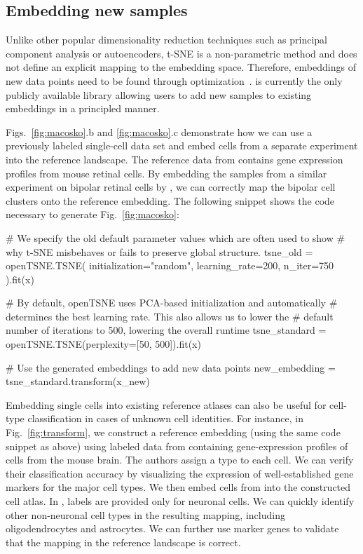 \documentclass[article]{jss}
\newcommand{\opentsne}{\pkg{openTSNE}\xspace}
\begin{document}
\subsection{Embedding new samples}

Unlike other popular dimensionality reduction techniques such as principal component analysis or autoencoders, t-SNE is a non-parametric method and does not define an explicit mapping to the embedding space. Therefore, embeddings of new data points need to be found through optimization~\citep{policar2021embedding}. \opentsne is currently the only publicly available library allowing users to add new samples to existing embeddings in a principled manner.

Figs.~\ref{fig:macosko}.b and \ref{fig:macosko}.c demonstrate how we can use a previously labeled single-cell data set and embed cells from a separate experiment into the reference landscape. The reference data from \citet{macosko2015highly} contains gene expression profiles from mouse retinal cells. By embedding the samples from a similar experiment on bipolar retinal cells by \citet{shekhar2016comprehensive}, we can correctly map the bipolar cell clusters onto the reference embedding. The following snippet shows the code necessary to generate Fig.~\ref{fig:macosko}:
\begin{CodeChunk}
\begin{CodeInput}
# We specify the old default parameter values which are often used to show
# why t-SNE misbehaves or fails to preserve global structure.
tsne_old = openTSNE.TSNE(
    initialization="random", learning_rate=200, n_iter=750
).fit(x)

# By default, openTSNE uses PCA-based initialization and automatically
# determines the best learning rate. This also allows us to lower the
# default number of iterations to 500, lowering the overall runtime
tsne_standard = openTSNE.TSNE(perplexity=[50, 500]).fit(x)

# Use the generated embeddings to add new data points
new_embedding = tsne_standard.transform(x_new)
\end{CodeInput}
\end{CodeChunk}

Embedding single cells into existing reference atlases can also be useful for cell-type classification in cases of unknown cell identities. For instance, in Fig.~\ref{fig:transform}, we construct a reference embedding (using the same code snippet as above) using labeled data from \citet{hochgerner2018conserved} containing gene-expression profiles of cells from the mouse brain. The authors assign a type to each cell. We can verify their classification accuracy by visualizing the expression of well-established gene markers for the major cell types. We then embed cells from \citet{harris2018classes} into the constructed cell atlas. In \citet{harris2018classes}, labels are provided only for neuronal cells. We can quickly identify other non-neuronal cell types in the resulting mapping, including oligodendrocytes and astrocytes. We can further use marker genes to validate that the mapping in the reference landscape is correct.
\end{document}
